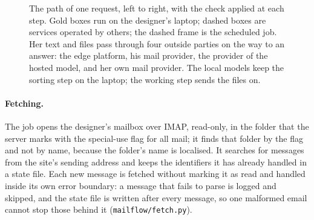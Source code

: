 \documentclass[sigconf,nonacm]{acmart}
\newcommand{\code}[1]{\textnormal{\texttt{\small #1}}}
\begin{document}
\begin{figure}[t]
  \caption{The path of one request, left to right, with the check applied at each step. Gold
  boxes run on the designer's laptop; dashed boxes are services operated by others; the dashed
  frame is the scheduled job. Her text and files pass through four outside parties on the way
  to an answer: the edge platform, his mail provider, the provider of the hosted model, and her
  own mail provider. The local models keep the sorting step on the laptop; the working step
  sends the files on.}
  \label{fig:askpath}
\end{figure}

\paragraph{Fetching.}
The job opens the designer's mailbox over IMAP, read-only, in the folder that the server marks
with the special-use flag for all mail; it finds that folder by the flag and not by name,
because the folder's name is localised. It searches for messages from the site's sending
address and keeps the identifiers it has already handled in a state file. Each new message is
fetched without marking it as read and handled inside its own error boundary: a message that
fails to parse is logged and skipped, and the state file is written after every message, so one
malformed email cannot stop those behind it (\code{mailflow/fetch.py}).
\end{document}
